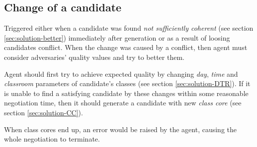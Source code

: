 \documentclass[../../ThesisDoc]{subfiles}
\begin{document}

\subsection{Change of a candidate}
\label{sec:solution-change}

Triggered either when a candidate was found \emph{not sufficiently coherent}
(see section \ref{sec:solution-better}) immediately after generation
or as a result of loosing candidates conflict.
When the change was caused by a conflict, then agent must consider adversaries'
quality values and try to better them.

Agent should first try to achieve expected quality by changing
\emph{day}, \emph{time} and \emph{classroom} parameters of candidate's classes
(see section \ref{sec:solution-DTR}).
If it is unable to find a satisfying candidate by these changes within some
reasonable negotiation time, then it should generate a candidate with new
\emph{class core} (see section \ref{sec:solution-CC}).

When class cores end up, an error would be raised by the agent, causing the whole
negotiation to terminate.

\end{document}

